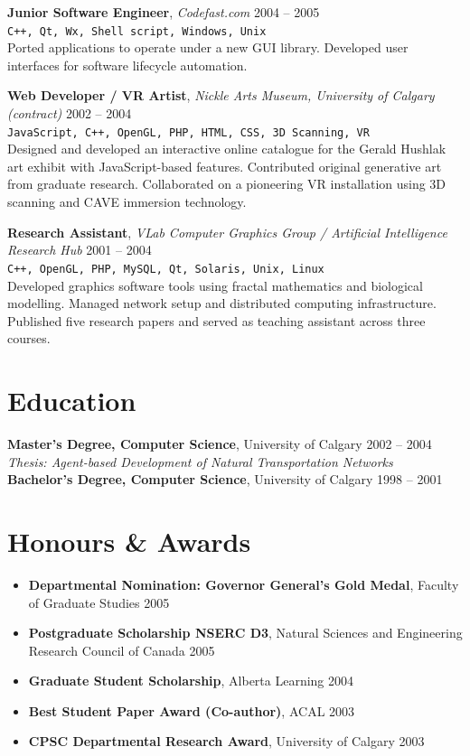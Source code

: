 \documentclass[10pt]{article}
\begin{document}
\textbf{Junior Software Engineer}, \textit{Codefast.com} \hfill 2004 -- 2005
\\\texttt{\small C++, Qt, Wx, Shell script, Windows, Unix}
\\[-2pt]
Ported applications to operate under a new GUI library. Developed user interfaces for software lifecycle automation.


\textbf{Web Developer / VR Artist}, \textit{Nickle Arts Museum, University of Calgary (contract)} \hfill 2002 -- 2004
\\\texttt{\small JavaScript, C++, OpenGL, PHP, HTML, CSS, 3D Scanning, VR}
\\[-2pt]
Designed and developed an interactive online catalogue for the Gerald Hushlak art exhibit with JavaScript-based features. Contributed original generative art from graduate research. Collaborated on a pioneering VR installation using 3D scanning and CAVE immersion technology.


\textbf{Research Assistant}, \textit{VLab Computer Graphics Group / Artificial Intelligence Research Hub} \hfill 2001 -- 2004
\\\texttt{\small C++, OpenGL, PHP, MySQL, Qt, Solaris, Unix, Linux}
\\[-2pt]
Developed graphics software tools using fractal mathematics and biological modelling. Managed network setup and distributed computing infrastructure. Published five research papers and served as teaching assistant across three courses.


\section*{Education}
\textbf{Master's Degree, Computer Science}, University of Calgary \hfill 2002 -- 2004
\\\textit{\small Thesis: Agent-based Development of Natural Transportation Networks}
\\[2pt]
\textbf{Bachelor's Degree, Computer Science}, University of Calgary \hfill 1998 -- 2001
\\[2pt]

\section*{Honours \& Awards}
\begin{itemize}[nosep, leftmargin=0pt, label={}]
    \item \textbf{Departmental Nomination: Governor General's Gold Medal}, Faculty of Graduate Studies \hfill 2005
    \item \textbf{Postgraduate Scholarship NSERC D3}, Natural Sciences and Engineering Research Council of Canada \hfill 2005
    \item \textbf{Graduate Student Scholarship}, Alberta Learning \hfill 2004
    \item \textbf{Best Student Paper Award (Co-author)}, ACAL \hfill 2003
    \item \textbf{CPSC Departmental Research Award}, University of Calgary \hfill 2003
\end{itemize}
\end{document}
